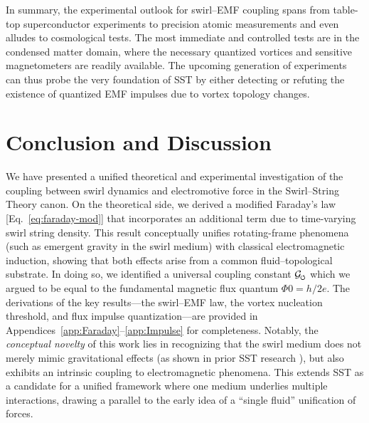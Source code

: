 \documentclass[12pt]{article}
\DeclareRobustCommand{\swirlarrow}{
\mathchoice{\mkern-2mu\scriptstyle\boldsymbol{\circlearrowleft}}%
{\mkern-2mu\scriptstyle\boldsymbol{\circlearrowleft}}%
{\mkern-2mu\scriptscriptstyle\boldsymbol{\circlearrowleft}}%
{\mkern-2mu\scriptscriptstyle\boldsymbol{\circlearrowleft}}
}%
\newcommand{\Gswirl}{\mathcal{G}_{\swirlarrow}}
\begin{document}
In summary, the experimental outlook for swirl–EMF coupling spans from table-top superconductor experiments to precision atomic measurements and even alludes to cosmological tests. The most immediate and controlled tests are in the condensed matter domain, where the necessary quantized vortices and sensitive magnetometers are readily available. The upcoming generation of experiments can thus probe the very foundation of SST by either detecting or refuting the existence of quantized EMF impulses due to vortex topology changes.


\section{Conclusion and Discussion}\label{sec:conclusion}

We have presented a unified theoretical and experimental investigation of the coupling between swirl dynamics and electromotive force in the Swirl--String Theory canon. On the theoretical side, we derived a modified Faraday's law [Eq.~\eqref{eq:faraday-mod}] that incorporates an additional term due to time-varying swirl string density. This result conceptually unifies rotating-frame phenomena (such as emergent gravity in the swirl medium) with classical electromagnetic induction, showing that both effects arise from a common fluid–topological substrate. In doing so, we identified a universal coupling constant $\Gswirl$ which we argued to be equal to the fundamental magnetic flux quantum $\Phi{0}=h/2e$. The derivations of the key results—the swirl–EMF law, the vortex nucleation threshold, and flux impulse quantization—are provided in Appendices~\ref{app:Faraday}--\ref{app:Impulse} for completeness. Notably, the \emph{conceptual novelty} of this work lies in recognizing that the swirl medium does not merely mimic gravitational effects (as shown in prior SST research \cite{Iskandarani2025RotatingFrame}), but also exhibits an intrinsic coupling to electromagnetic phenomena. This extends SST as a candidate for a unified framework where one medium underlies multiple interactions, drawing a parallel to the early idea of a ``single fluid'' unification of forces.
\end{document}
